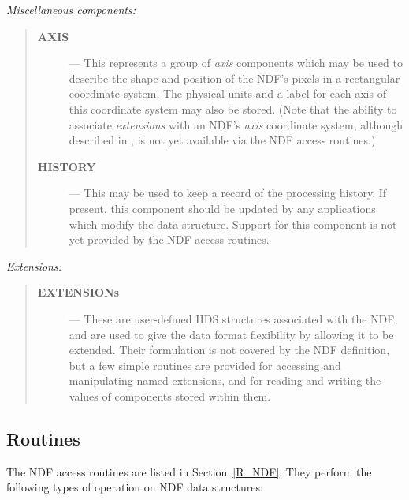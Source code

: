 {\large \em Miscellaneous components:}

\begin{quote}
\begin{description}

\item[{\bf AXIS}] --- This represents a group of {\em axis\/} components which
may be used to describe the shape and position of the NDF's pixels in a
rectangular coordinate system. 
The physical units and a label for each axis of this coordinate system may 
also be stored.
(Note that the ability to associate {\em extensions\/} with an NDF's {\em
axis\/} coordinate system, although described in , is
not yet available via the NDF access routines.)

\item[{\bf HISTORY}] --- This may be used to keep a record of the processing
history.
If present, this component should be updated by any applications which
modify the data structure. 
Support for this component is not yet provided by the NDF access routines.

\end{description}
\end{quote}

{\large \em Extensions:}

\begin{quote}
\begin{description}

\item[{\bf EXTENSIONs}] --- These are user-defined HDS structures associated
with the NDF, and are used to give the data format flexibility by allowing it
to be extended. 
Their formulation is not covered by the NDF definition, but a few simple
routines are provided for accessing and manipulating named extensions, and
for reading and writing the values of components stored within them. 

\end{description}
\end{quote}

\subsection{Routines}

The NDF access routines are listed in Section~\ref{R_NDF}.
They perform the following types of operation on NDF data structures: 


